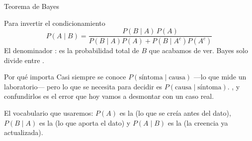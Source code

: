 \documentclass[aspectratio=169,10pt]{beamer}
\begin{document}
\begin{frame}{Teorema de Bayes}
  \scriptsize
  \begin{block}{Para invertir el condicionamiento}
    \scriptsize
    \[ P(A\mid B)=\frac{P(B\mid A)\,P(A)}
                       {P(B\mid A)P(A)+P(B\mid A^{c})P(A^{c})} \]
    El denominador : es la probabilidad total de $B$ que
    acabamos de ver. Bayes solo divide 
    entre .
  \end{block}

  \vspace{0.1cm}
  \begin{alertblock}{Por qué importa}
    \tiny
    Casi siempre se conoce $P(\text{síntoma}\mid\text{causa})$ —lo que mide un
    laboratorio— pero lo que se necesita para decidir es
    $P(\text{causa}\mid\text{síntoma})$. , y
    confundirlos es el error que hoy vamos a desmontar con un caso real.
  \end{alertblock}

  \vspace{0.08cm}
  {\tiny\color{uniGris} El vocabulario que usaremos: $P(A)$ es la
   (lo que se creía antes del dato), $P(B\mid A)$
  es la  (lo que aporta el dato) y $P(A\mid B)$ es la
   (la creencia ya actualizada).}
\end{frame}
\end{document}
